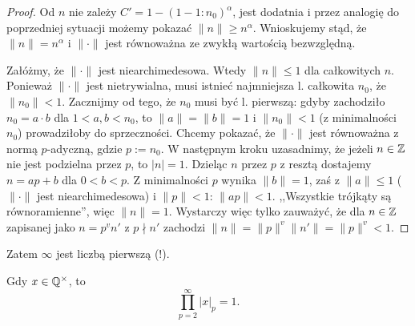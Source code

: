 \begin{proof}
	Od $n$ nie zależy $C' = 1 - (1-1:n_0)^\alpha$, jest dodatnia i przez analogię do poprzedniej sytuacji możemy pokazać $\|n\| \ge n^\alpha$.
	Wnioskujemy stąd, że $\|n\| = n^\alpha$ i $\|\cdot\|$ jest równoważna ze zwykłą wartością bezwzględną.

	Załóżmy, że $\|\cdot\|$ jest niearchimedesowa.
	Wtedy $\|n\| \le 1$ dla całkowitych $n$.
	Ponieważ $\|\cdot\|$ jest nietrywialna, musi istnieć najmniejsza l. całkowita $n_0$, że $\|n_0\| < 1$.
	Zacznijmy od tego, że $n_0$ musi być l. pierwszą: gdyby zachodziło $n_0 = a \cdot b$ dla $1 < a,b < n_0$, to $\|a\| = \|b\| = 1$ i $\|n_0\| < 1$ (z minimalności $n_0$) prowadziłoby do sprzeczności.
	Chcemy pokazać, że $\|\cdot\|$ jest równoważna z normą $p$-adyczną, gdzie $p := n_0$.
	W następnym kroku uzasadnimy, że jeżeli $n \in \mathbb Z$ nie jest podzielna przez $p$, to $|n| = 1$.
	Dzieląc $n$ przez $p$ z resztą dostajemy $n = ap + b$ dla $0 < b < p$.
	Z minimalności $p$ wynika $\|b\| = 1$, zaś z $\|a\| \le 1$ ($\|\cdot\|$ jest niearchimedesowa) i $\|p\| < 1$: $\|ap\| < 1$.
	,,Wszystkie trójkąty są równoramienne'', więc $\|n\| = 1$.
	Wystarczy więc tylko zauważyć, że dla $n \in \mathbb Z$ zapisanej jako $n = p^v n'$ z $p \nmid n'$ zachodzi $\|n\| = \|p\|^v \|n'\| = \|p\|^v < 1$.
\end{proof}

\begin{historia}\end{historia}

Zatem $\infty$ jest liczbą pierwszą (!).

\begin{wniosek}
	Gdy $x \in \mathbb Q^\times$, to
	\[
		\prod_{p = 2}^\infty |x|_p = 1.
	\]
\end{wniosek}